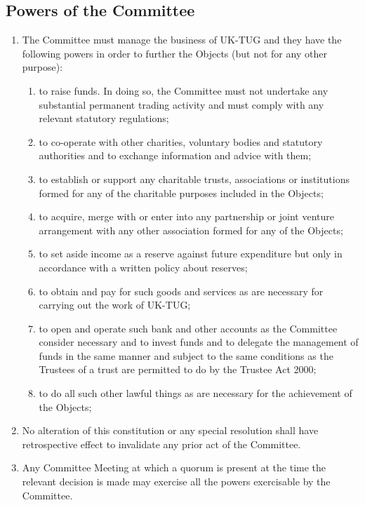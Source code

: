 \documentclass[a4paper,11pt]{article}
\begin{document}
\subsection{Powers of the Committee}

\begin{enumerate}
\item The Committee must manage the business of UK-TUG and they have the
  following powers in order to further the Objects (but not for any other
  purpose):
  \begin{enumerate}
  \item to raise funds. In doing so, the Committee must not undertake any
    substantial permanent trading activity and must comply with any relevant
    statutory regulations;
  \item to co-operate with other charities, voluntary bodies and statutory
    authorities and to exchange information and advice with them;
  \item to establish or support any charitable trusts, associations or
    institutions formed for any of the charitable purposes included in the
    Objects;
  \item to acquire, merge with or enter into any partnership or joint venture
    arrangement with any other association formed for any of the
    Objects;
  \item to set aside income as a reserve against future expenditure but only in
    accordance with a written policy about reserves;
  \item to obtain and pay for such goods and services as are necessary for
    carrying out the work of UK-TUG;
  \item to open and operate such bank and other accounts as the Committee
    consider necessary and to invest funds and to delegate the management of
    funds in the same manner and subject to the same conditions as the Trustees
    of a trust are permitted to do by the Trustee Act 2000;
  \item to do all such other lawful things as are necessary for the achievement
    of the Objects;
  \end{enumerate}
\item No alteration of this constitution or any special resolution shall have
  retrospective effect to invalidate any prior act of the Committee.
\item Any Committee Meeting at which a quorum is present at the time the
  relevant decision is made may exercise all the powers exercisable by the
  Committee.
\end{enumerate}
\end{document}
